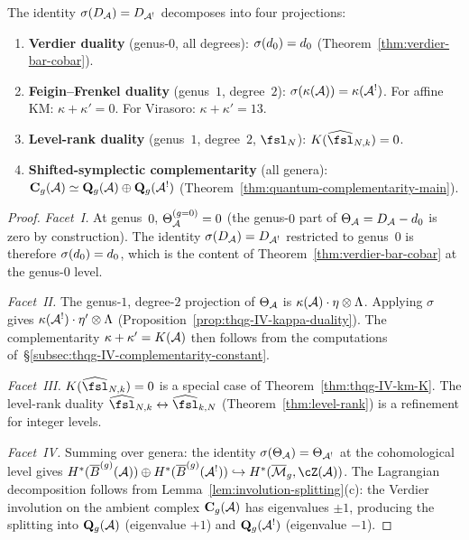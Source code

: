 \begin{theorem}
\label{thm:thqg-IV-four-facets}
The identity $\sigma(D_{\mathcal{A}}) = D_{\mathcal{A}^!}$ decomposes into four
projections:
\begin{enumerate}[label=\textup{(\Roman*)}]
\item \textbf{Verdier duality} (genus-$0$, all degrees):
 $\sigma(d_0) = d_0$
 (Theorem~\ref{thm:verdier-bar-cobar}).

\item \textbf{Feigin--Frenkel duality} (genus~$1$, degree~$2$):
 $\sigma(\kappa(\mathcal{A})) = \kappa(\mathcal{A}^!)$.
 For affine KM: $\kappa + \kappa' = 0$.
 For Virasoro: $\kappa + \kappa' = 13$.

\item \textbf{Level-rank duality} (genus~$1$, degree~$2$, $\fsl_N$):
 $K(\widehat{\fsl}_{N,k}) = 0$.

\item \textbf{Shifted-symplectic complementarity} (all genera):
 $\mathbf{C}_g(\mathcal{A}) \simeq \mathbf{Q}_g(\mathcal{A}) \oplus
 \mathbf{Q}_g(\mathcal{A}^!)$
 (Theorem~\ref{thm:quantum-complementarity-main}).
\end{enumerate}
\end{theorem}

\begin{proof}
\emph{Facet~I.}
At genus~$0$, $\Theta_{\mathcal{A}}^{(g=0)} = 0$ (the genus-$0$ part of
$\Theta_{\mathcal{A}} = D_{\mathcal{A}} - d_0$ is zero by construction). The identity
$\sigma(D_{\mathcal{A}}) = D_{\mathcal{A}^!}$ restricted to genus~$0$ is therefore
$\sigma(d_0) = d_0$, which is the content of
Theorem~\ref{thm:verdier-bar-cobar} at the genus-$0$ level.

\emph{Facet~II.}
The genus-$1$, degree-$2$ projection of $\Theta_{\mathcal{A}}$ is
$\kappa(\mathcal{A}) \cdot \eta \otimes \Lambda$.
Applying $\sigma$ gives $\kappa(\mathcal{A}^!) \cdot \eta' \otimes \Lambda$
(Proposition~\ref{prop:thqg-IV-kappa-duality}).
The complementarity $\kappa + \kappa' = K(\mathcal{A})$ then follows from
the computations of~\S\ref{subsec:thqg-IV-complementarity-constant}.

\emph{Facet~III.}
$K(\widehat{\fsl}_{N,k}) = 0$ is a special case of
Theorem~\ref{thm:thqg-IV-km-K}. The level-rank duality
$\widehat{\fsl}_{N,k} \leftrightarrow \widehat{\fsl}_{k,N}$
(Theorem~\ref{thm:level-rank}) is a refinement for integer levels.

\emph{Facet~IV.}
Summing over genera: the identity $\sigma(\Theta_{\mathcal{A}}) = \Theta_{\mathcal{A}^!}$
at the cohomological level gives
$H^*(\barB^{(g)}(\cA)) \oplus H^*(\barB^{(g)}(\cA^!))
\hookrightarrow H^*(\overline{\cM}_g, \cZ(\cA))$.
The Lagrangian decomposition follows from
Lemma~\ref{lem:involution-splitting}(c): the Verdier involution on
the ambient complex $\mathbf{C}_g(\mathcal{A})$ has eigenvalues $\pm 1$,
producing the splitting into $\mathbf{Q}_g(\mathcal{A})$ (eigenvalue $+1$)
and $\mathbf{Q}_g(\mathcal{A}^!)$ (eigenvalue $-1$).
\end{proof}


